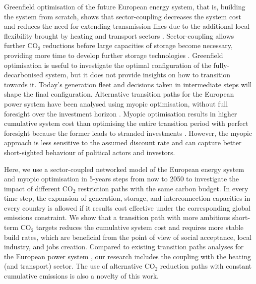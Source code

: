 \documentclass[5p]{elsarticle} %
\begin{document}
Greenfield optimisation of the future European energy system, that is, building the system from scratch, shows that sector-coupling decreases the system cost and reduces the need for extending transmission lines due to the additional local flexibility brought by heating and transport sectors \cite{Brown_2018}. Sector-coupling allows further CO$_2$ reductions before large capacities of storage become necessary, providing more time to develop further storage technologies \cite{Victoria_2019_storage}. Greenfield optimisation is useful to investigate the optimal configuration of the fully-decarbonised system, but it does not provide insights on how to transition towards it. Today's generation fleet and decisions taken in intermediate steps will shape the final configuration. 
Alternative transition paths for the European power system have been analysed using myopic optimisation, without full foresight over the investment horizon \cite{Bogdanov_2019, Plesmann_2017, Gerbaulet_2019, Poncelet_2016}. Myopic optimisation results in higher cumulative system cost than optimising the entire transition period with perfect foresight because the former leads to stranded investments \cite{Gerbaulet_2019, Heuberger_2018}. However, the myopic approach is less sensitive to the assumed discount rate and can capture better short-sighted behaviour of political actors and investors. 

Here, we use a sector-coupled networked model of the European energy system and myopic optimisation in 5-years steps from now to 2050 to investigate the impact of different CO$_2$ restriction paths with the same carbon budget. In every time step, the expansion of generation, storage, and interconnection capacities in every country is allowed  if it results cost effective under the corresponding global emissions constraint. We show that a transition path with more ambitious short-term CO$_2$ targets reduces the cumulative system cost and requires more stable build rates, which are beneficial from the point of view of social acceptance, local industry, and jobs creation. Compared to existing transition paths analyses for the European power system \cite{Plesmann_2017, Gerbaulet_2019, Poncelet_2016}, our research includes the coupling with the heating \textcolor[rgb]{1,0,0}{(and transport)} sector. The use of alternative CO$_2$ reduction paths with constant cumulative emissions is also a novelty of this work. 
\end{document}
